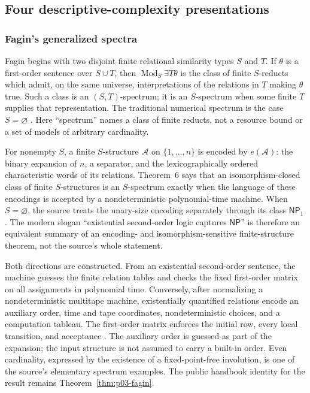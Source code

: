 
\subsection{Four descriptive-complexity presentations}
\label{sec:p09-presentation-n-c-004}

\subsubsection{Fagin's generalized spectra}

Fagin begins with two disjoint finite relational similarity types \(S\) and
\(T\).  If \(\theta\) is a first-order sentence over \(S\cup T\), then
\(\operatorname{Mod}_{S}\exists T\theta\) is the class of finite
\(S\)-reducts which admit, on the same universe, interpretations of the
relations in \(T\) making \(\theta\) true.  Such a class is an
\((S,T)\)-spectrum; it is an \(S\)-spectrum when some finite \(T\) supplies
that representation.  The traditional numerical spectrum is the case
\(S=\varnothing\) \cite[pp.~48--49]{Fagin1974}.  Here ``spectrum'' names a
class of finite reducts, not a resource bound or a set of models of arbitrary
cardinality.

For nonempty \(S\), a finite \(S\)-structure \(\mathcal A\) on
\(\{1,\ldots,n\}\) is encoded by \(e(\mathcal A)\): the binary expansion of
\(n\), a separator, and the lexicographically ordered characteristic words of
its relations.  Theorem~6 says that an isomorphism-closed class of finite
\(S\)-structures is an \(S\)-spectrum exactly when the language of these
encodings is accepted by a nondeterministic polynomial-time machine.  When
\(S=\varnothing\), the source treats the unary-size encoding separately through
its class \(\mathsf{NP}_1\) \cite[pp.~52--54]{Fagin1974}.  The modern slogan
``existential second-order logic captures \(\mathsf{NP}\)'' is therefore an
equivalent summary of an encoding- and isomorphism-sensitive finite-structure
theorem, not the source's whole statement.

Both directions are constructed.  From an existential second-order sentence,
the machine guesses the finite relation tables and checks the fixed first-order
matrix on all assignments in polynomial time.  Conversely, after normalizing a
nondeterministic multitape machine, existentially quantified relations encode
an auxiliary order, time and tape coordinates, nondeterministic choices, and a
computation tableau.  The first-order matrix enforces the initial row, every
local transition, and acceptance \cite[pp.~53--56]{Fagin1974}.  The auxiliary
order is guessed as part of the expansion; the input structure is not assumed
to carry a built-in order.  Even cardinality, expressed by the existence of a
fixed-point-free involution, is one of the source's elementary spectrum
examples.  The public handbook identity for the result remains
Theorem~\ref{thm:p03-fagin}.

